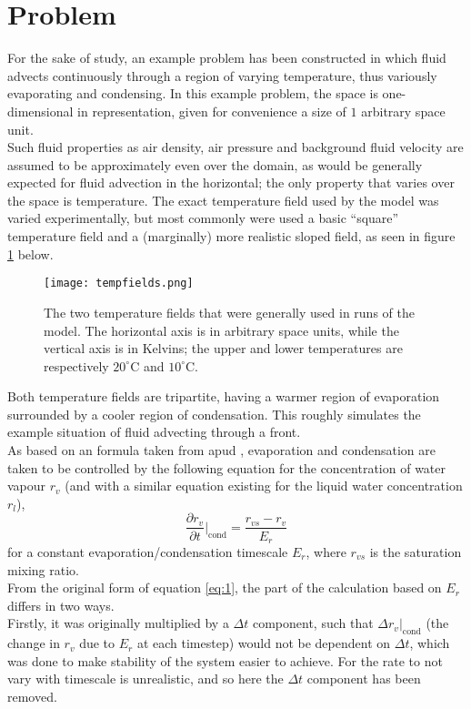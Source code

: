 \documentclass[11pt]{article}
\begin{document}
\section{Problem}
For the sake of study, an example problem has been constructed in which fluid advects continuously through a region of varying temperature, thus variously evaporating and condensing. In this example problem, the space is one-dimensional in representation, given for convenience a size of $1$ arbitrary space unit. \\
Such fluid properties as air density, air pressure and background fluid velocity are assumed to be approximately even over the domain, as would be generally expected for fluid advection in the horizontal; the only property that varies over the space is temperature. The exact temperature field used by the model was varied experimentally, but most commonly were used a basic ``square'' temperature field and a (marginally) more realistic sloped field, as seen in figure \ref{fig:tempfields} below.
\begin{figure}[H]
\centering
\texttt{[image: tempfields.png]}
\caption{The two temperature fields that were generally used in runs of the model. The horizontal axis is in arbitrary space units, while the vertical axis is in Kelvins; the upper and lower temperatures are respectively $20^{\circ}$C and $10^{\circ}$C.}
\label{fig:tempfields}
\end{figure}
Both temperature fields are tripartite, having a warmer region of evaporation surrounded by a cooler region of condensation. This roughly simulates the example situation of fluid advecting through a front. \\
As based on an formula taken from \citet[p.~2920]{BF2002} apud \citet{RH1983}, evaporation and condensation are taken to be controlled by the following equation for the concentration of water vapour $r_v$ (and with a similar equation existing for the liquid water concentration $r_l$),
\begin{equation} \label{eq:1}
\frac{\partial r_v}{\partial t}|_{\text{cond}}=\frac{r_{vs} - r_v}{E_r}
\end{equation}
for a constant evaporation/condensation timescale $E_r$, where $r_{vs}$ is the saturation mixing ratio. \\
From the original form of equation \ref{eq:1}, the part of the calculation based on $E_r$ differs in two ways. \\
Firstly, it was originally multiplied by a $\Delta t$ component, such that $\Delta r_v|_{\text{cond}}$ (the change in $r_v$ due to $E_r$ at each timestep) would not be dependent on $\Delta t$, which was done to make stability of the system easier to achieve. For the rate to not vary with timescale is unrealistic, and so here the $\Delta t$ component has been removed. \\
\end{document}
